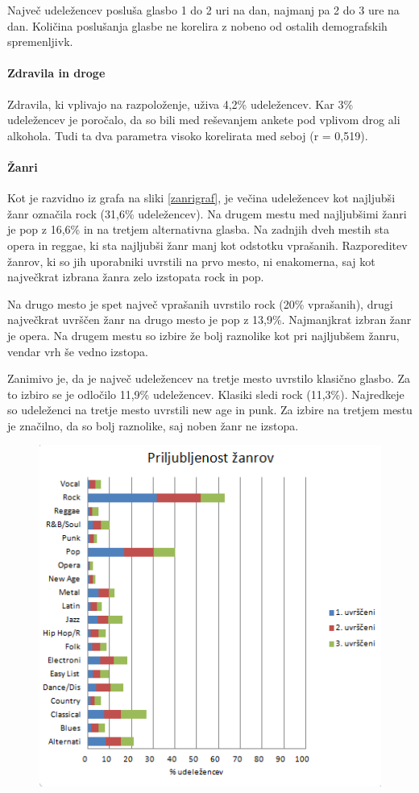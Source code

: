 \documentclass[a4paper, 12pt]{book}
\begin{document}
{Največ udeležencev posluša glasbo 1 do 2 uri na dan, najmanj pa 2 do 3 ure na dan. Količina poslušanja glasbe ne korelira z nobeno od ostalih demografskih spremenljivk. 

\paragraph{Zdravila in droge}

Zdravila, ki vplivajo na razpoloženje, uživa 4,2\% udeležencev. Kar 3\% udeležencev je poročalo, da so bili med reševanjem ankete pod vplivom drog ali alkohola. Tudi ta dva parametra visoko korelirata med seboj (r = 0,519).

\paragraph{Žanri}

Kot je razvidno iz grafa na sliki \ref{zanrigraf}, je večina udeležencev kot najljubši žanr označila rock (31,6\% udeležencev). Na drugem mestu med najljubšimi žanri je pop z 16,6\% in na tretjem alternativna glasba. Na zadnjih dveh mestih sta opera in reggae, ki sta najljubši žanr manj kot odstotku vprašanih. Razporeditev žanrov, ki so jih uporabniki uvrstili na prvo mesto, ni enakomerna, saj kot največkrat izbrana žanra zelo izstopata rock in pop.  

Na drugo mesto je spet največ vprašanih uvrstilo rock (20\% vprašanih), drugi največkrat uvrščen žanr na drugo mesto je pop z 13,9\%. Najmanjkrat izbran žanr je opera. Na drugem mestu so izbire že bolj raznolike kot pri najljubšem žanru, vendar vrh še vedno izstopa. 

Zanimivo je, da je največ udeležencev na tretje mesto uvrstilo klasično glasbo. Za to izbiro se je odločilo 11,9\% udeležencev. Klasiki sledi rock (11,3\%). Najredkeje so udeleženci na tretje mesto uvrstili new age in punk. Za izbire na tretjem mestu je značilno, da so bolj raznolike, saj noben žanr ne izstopa. 

\begin{figure}[hbt]
\centering
\includegraphics{images/genre.png}


\end{figure}}
\end{document}
